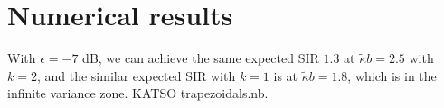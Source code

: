 \documentclass[conference]{IEEEtran}
\theoremstyle{definition}
\theoremstyle{plain}
\begin{document}
          
          
          
        

          
          
          
          \section{Numerical results}

          With $\epsilon = -7$ dB, we can achieve the same expected SIR $1.3$ at $\tilde{\kappa} b= 2.5$ with $k=2$, and the similar expected SIR with $k=1$ is at $\tilde{\kappa} b = 1.8$, which is in the infinite variance zone. KATSO trapezoidals.nb.
          
          
          
          

          
         
         
             
             
\end{document}
